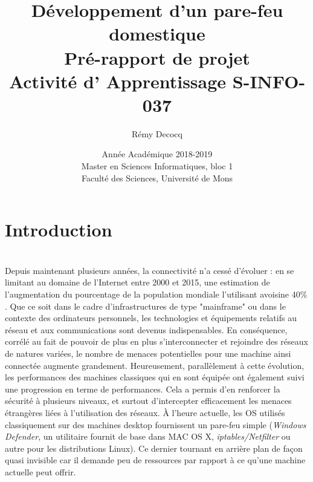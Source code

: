 \documentclass[]{article}
\begin{document}
\title{
\vspace{1.6cm}
{\Huge Développement d'un pare-feu domestique}\\
\vspace{0.5cm}
{\Huge Pré-rapport de projet}\\
\vspace{0.2cm}
{\large Activité d' Apprentissage \textsf{S-INFO-037}}\\
}



\author{
\vspace{0.9cm}
\huge{Rémy Decocq}
}

\date{
\vspace{8.5cm}
Année Académique 2018-2019\\
Master en Sciences Informatiques, bloc 1\\
Faculté des Sciences, Université de Mons}

\maketitle          

\thispagestyle{empty}   

\newpage

\tableofcontents
\newpage

\section*{Introduction}
~\\

Depuis maintenant plusieurs années, la connectivité n'a cessé d'évoluer : en se limitant au domaine de l'Internet entre 2000 et 2015, une estimation de l'augmentation du pourcentage de la population mondiale l'utilisant avoisine 40\%  \cite{IWS} \cite{Cable}. Que ce soit dans le cadre d'infrastructures de type "mainframe" ou dans le contexte des ordinateurs personnels, les technologies et équipements relatifs au réseau et aux communications sont devenus indispensables. En conséquence, corrélé au fait de pouvoir de plus en plus s'interconnecter et rejoindre des réseaux de natures variées, le nombre de menaces potentielles pour une machine ainsi connectée augmente grandement. Heureusement, parallèlement à cette évolution, les performances des machines classiques qui en sont équipée ont également suivi une progression en terme de performances. Cela a permis d'en renforcer la sécurité à plusieurs niveaux, et surtout d'intercepter efficacement les menaces étrangères liées à l'utilisation des réseaux. À l'heure actuelle, les OS utilisés classiquement sur des machines desktop fournissent un pare-feu simple (\textit{Windows Defender}, un utilitaire fournit de base dans MAC OS X, \textit{iptables/Netfilter} ou autre pour les distributions Linux). Ce dernier tournant en arrière plan de façon quasi invisible car il demande peu de ressources par rapport à ce qu'une machine actuelle peut offrir.\\
\end{document}
